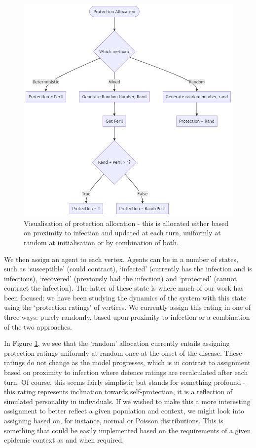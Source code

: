 \documentclass[../report.tex]{subfiles}
\begin{document}
\begin{figure}[!ht] 
  \centering
  \includegraphics[width=0.75\linewidth]{assets/protection}
  \caption{Visualisation of protection allocation - this is allocated either based on proximity to infection and updated at each turn, uniformly at random at initialisation or by combination of both.}
  \label{fig:protection}
\end{figure}

We then assign an agent to each vertex. Agents can be in a number of states, such as `susceptible' (could contract), `infected' (currently has the infection and is infectious), `recovered' (previously had the infection) and `protected' (cannot contract the infection). The latter of these state is where much of our work has been focused: we have been studying the dynamics of the system with this state using the `protection ratings' of vertices. We currently assign this rating in one of three ways: purely randomly, based upon proximity to infection or a combination of the two approaches.

In Figure \ref{fig:protection}, we see that the `random' allocation currently entails assigning protection ratings uniformly at random once at the onset of the disease. These ratings do not change as the model progresses, which is in contrast to assignment based on proximity to infection where defence ratings are recalculated after each turn. Of course, this seems fairly simplistic but stands for something profound - this rating represents inclination towards self-protection, it is a reflection of simulated personality in individuals. If we wished to make this a more interesting assignment to better reflect a given population and context, we might look into assigning based on, for instance, normal or Poisson distributions. This is something that could be easily implemented based on the requirements of a given epidemic context as and when required.
\end{document}
